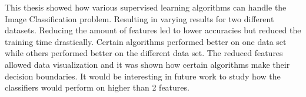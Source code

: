This thesis showed how various supervised learning algorithms can handle the Image Classification problem. Resulting in varying results for two different datasets. Reducing the amount of features led to lower accuracies but reduced the training time drastically. Certain algorithms performed better on one data set while others performed better on the different data set. The reduced features allowed data visualization and it was shown how certain algorithms make their decision boundaries. It would be interesting in future work to study how the classifiers would perform on higher than 2 features.     